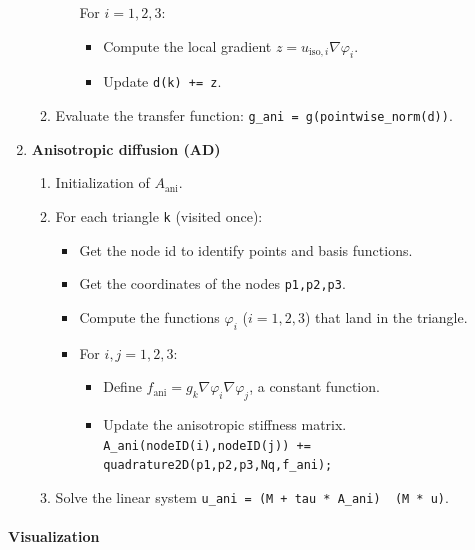 \documentclass{report}
\renewcommand\phi{\varphi}
\newcommand\bslash{\symbol{`\\}}
\def\iso{\text{iso}}
\def\ani{\text{ani}}
\begin{document}
\begin{enumerate}
\begin{enumerate}
\begin{itemize}
			For $i = 1,2,3$:
			\begin{itemize}
				\item
				Compute the local gradient $z = u_{\iso,i} \nabla \phi_i$.
				\item
				Update \texttt{d(k) += z}.
			\end{itemize}
		\end{itemize}
		\item 
		Evaluate the transfer function: \texttt{g\_ani = g(pointwise\_norm(d))}.
	\end{enumerate}
	\item
	\textbf{Anisotropic diffusion (AD)}
	\begin{enumerate}
		\item 
		Initialization of $A_\ani$.
		\item 
		For each triangle \texttt{k} (visited once):
		\begin{itemize}
			\item
			Get the node id to identify points and basis functions.
			\item 
			Get the coordinates of the nodes \texttt{p1,p2,p3}.
			\item 
			Compute the functions $\phi_i$ ($i=1,2,3$) that land in the triangle.
			\item 
			For $i,j=1,2,3$:
			\begin{itemize}
				\item
				Define $f_\ani = g_k \nabla \phi_i \nabla \phi_j$, a constant function.
				\item
				Update the anisotropic stiffness matrix.\\
				\texttt{A\_ani(nodeID(i),nodeID(j)) += quadrature2D(p1,p2,p3,Nq,f\_ani);}
			\end{itemize}
			
		\end{itemize}
		\item 
		Solve the linear system \texttt{u\_ani = (M + tau * A\_ani) \bslash\ (M * u)}.
	\end{enumerate}
\end{enumerate}

\paragraph{Visualization} 
\end{document}
